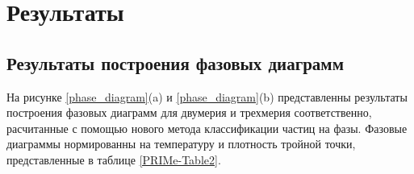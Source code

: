 \begin{table}[h!]
    \caption{Параметры, используемые в МД-моделировании для бимодальных расчетов:
    где $\rho$ — средняя плотность системы, $r_c$ — радиус отсечки,
    $T_{start}$ и $T_{stop}$ — начальная и конечная температуры моделирования,
    $n_{step}$ — количество шагов моделирования, а
    $\Delta t$ — временной шаг.}
    \label{MACR-Table1}
\end{table}


\section{Результаты}
\label{PRIMe-SecResults}

\subsection{Результаты построения фазовых диаграмм}
\label{PRIMe-SubSecPhaseDiagramMD}

На рисунке \ref{phase_diagram}(a) и \ref{phase_diagram}(b) представленны результаты построения фазовых диаграмм для двумерия и трехмерия соответственно, расчитанные с помощью нового метода классификации частиц на фазы.
Фазовые диаграммы нормированны на температуру и плотность тройной точки, представленные в таблице \ref{PRIMe-Table2}.

